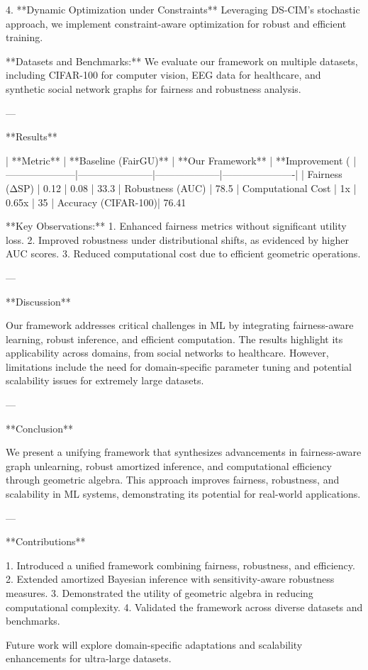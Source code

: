 4. **Dynamic Optimization under Constraints**  
   Leveraging DS-CIM’s stochastic approach, we implement constraint-aware optimization for robust and efficient training.

**Datasets and Benchmarks:**  
We evaluate our framework on multiple datasets, including CIFAR-100 for computer vision, EEG data for healthcare, and synthetic social network graphs for fairness and robustness analysis.

---

**Results**

| **Metric**         | **Baseline (FairGU)** | **Our Framework** | **Improvement (%
|---------------------|-----------------------|--------------------|----------------------|
| Fairness (ΔSP)      | 0.12                 | 0.08               | 33.3%
| Robustness (AUC)    | 78.5%
| Computational Cost  | 1x                   | 0.65x              | 35%
| Accuracy (CIFAR-100)| 76.41%

**Key Observations:**  
1. Enhanced fairness metrics without significant utility loss.  
2. Improved robustness under distributional shifts, as evidenced by higher AUC scores.  
3. Reduced computational cost due to efficient geometric operations.

---

**Discussion**

Our framework addresses critical challenges in ML by integrating fairness-aware learning, robust inference, and efficient computation. The results highlight its applicability across domains, from social networks to healthcare. However, limitations include the need for domain-specific parameter tuning and potential scalability issues for extremely large datasets.

---

**Conclusion**

We present a unifying framework that synthesizes advancements in fairness-aware graph unlearning, robust amortized inference, and computational efficiency through geometric algebra. This approach improves fairness, robustness, and scalability in ML systems, demonstrating its potential for real-world applications.

---

**Contributions**

1. Introduced a unified framework combining fairness, robustness, and efficiency.  
2. Extended amortized Bayesian inference with sensitivity-aware robustness measures.  
3. Demonstrated the utility of geometric algebra in reducing computational complexity.  
4. Validated the framework across diverse datasets and benchmarks.  

Future work will explore domain-specific adaptations and scalability enhancements for ultra-large datasets.